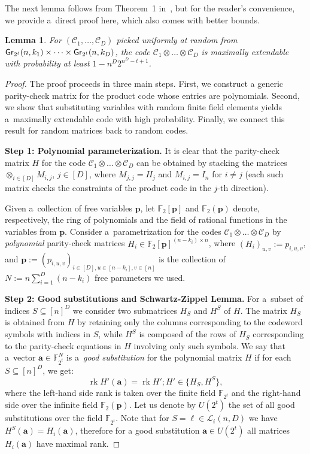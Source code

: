 \documentclass[conference]{IEEEtran}
\theoremstyle{plain}
\newtheorem{lemma}[theorem]{Lemma}
\theoremstyle{definition}
\theoremstyle{remark}
\newcommand{\vp}{\mathbf{p}}
\newcommand{\va}{\mathbf{a}}
\newcommand{\cC}{\mathcal{C}}
\newcommand{\cL}{\mathcal{L}}
\newcommand{\F}{\mathbb{F}}
\DeclareMathOperator{\rk}{rk}
\newcommand{\Gr}{{\sf Gr}}
\begin{document}
The next lemma follows from Theorem~1 in~\cite{panteleevMaximallyExtendableSheaf2024}, but for the reader's convenience, we provide a~direct proof here, which also comes with better bounds. 
\begin{lemma}\label{lemma:rand-universal}
    For $(\cC_1,\dots,\cC_D)$ picked uniformly at random from $\Gr_{2^t}(n,k_1)\times\cdots\times\Gr_{2^t}(n,k_D)$, the code $\cC_1\otimes\dots\otimes\cC_D$ is maximally extendable with probability at least $1 - n^D 2^{n^D - t + 1}$.
\end{lemma}
\begin{proof}
    The proof proceeds in three main steps. First, we construct a generic parity-check matrix for the product code whose entries are polynomials. Second, we show that substituting variables with random finite field elements yields a~maximally extendable code with high probability. Finally, we connect this result for random matrices back to random codes.

    \textbf{Step 1: Polynomial parameterization.}
    It is clear that the parity-check matrix $H$ for the code $\cC_1\otimes\dots \otimes \cC_D$ can be obtained by stacking the matrices $\otimes_{i\in[D]}M_{i,j}$, $j\in [D]$, where $M_{j,j}=H_j$ and $M_{i,j}=I_{n}$ for $i\ne j$ (each such matrix checks the constraints of the product code in the $j$-th direction). 
    
    Given a~collection of free variables $\vp$, let $\F_2[\vp]$ and $\F_2(\vp)$ denote, respectively, the ring of polynomials and the field of rational functions in the variables from $\vp$.   
    Consider a~parametrization for the codes $\cC_1\otimes\dots \otimes \cC_D$ by \emph{polynomial} parity-check matrices $H_i\in \F_2[\vp]^{(n - k_i)\times n}$, where $(H_i)_{u,v} := p_{i,u,v}$, and $\vp:=(p_{i,u,v})_{i\in [D],u\in [n-k_i],v\in [n]}$ is the collection of $N:=n\sum_{i=1}^D (n-k_i)$ free parameters we used. 

    \textbf{Step 2: Good substitutions and Schwartz-Zippel Lemma.}
    For a~subset of indices $S\subseteq [n]^D$ we consider two submatrices $H_S$ and $H^S$ of $H$. The matrix $H_S$ is obtained from $H$ by retaining only the columns corresponding to the codeword symbols with indices in $S$, while $H^S$ is composed of the rows of $H_S$ corresponding to the parity-check equations in $H$ involving only such symbols.
    We say that a~vector $\va\in\F_{2^t}^N$ is a~\emph{good substitution} for the polynomial matrix $H$ if for each $S\subseteq [n]^D$, we get:
    \begin{equation}\label{eq:good-cond}
    \rk H'(\va)=\rk H'; H'\in\{H_S,H^S\},    
    \end{equation}
    where the left-hand side rank is taken over the finite field $\F_{2^t}$ and the right-hand side over the infinite field $\F_2(\vp)$. Let us denote by $U(2^t)$ the set of all good substitutions over the field $\F_{2^t}$. Note that for $S=\ell\in \cL_i(n,D)$ we have $H^S(\va)=H_i(\va)$, therefore for a good substitution $\va\in U(2^t)$ all matrices $H_i(\va)$ have maximal rank.


\end{proof}
\end{document}
